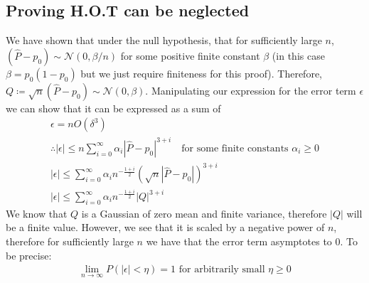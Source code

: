 \documentclass[]{article}
\newcommand{\Gaussian}{\mathcal{N}}
\begin{document}
\subsection{Proving H.O.T can be neglected}
We have shown that under the null hypothesis, that for sufficiently large $n$, $(\hat{P}-p_0) \sim \Gaussian(0, \beta/n)$ for some positive finite constant $\beta$ (in this case $\beta = p_0(1-p_0)$ but we just require finiteness for this proof). Therefore, $Q \coloneqq \sqrt{n} (\hat{P} - p_0) \sim \Gaussian(0,\beta)$. Manipulating our expression for the error term $\epsilon$ we can show that it can be expressed as a sum of 
%
\begin{equation}
\begin{gathered}
\epsilon = n O(\delta^3) \\
\therefore |\epsilon| \leq n \sum_{i=0}^{\infty} \alpha_i|\hat{P} - p_0|^{3+i} 
\quad \text{for some finite constants } \alpha_i \geq 0 \\
|\epsilon| \leq \sum_{i=0}^{\infty} \alpha_i n^{-\frac{1+i}{2}}( \sqrt{n}|\hat{P} - p_0|)^{3+i} \\
|\epsilon| \leq \sum_{i=0}^{\infty} \alpha_i n^{-\frac{1+i}{2}}|Q|^{3+i}
\end{gathered}
\end{equation}
%
We know that $Q$ is a Gaussian of zero mean and finite variance, therefore $|Q|$ will be a finite value. However, we see that it is scaled by a negative power of $n$, therefore for sufficiently large $n$ we have that the error term asymptotes to 0. To be precise:
%
\begin{equation}
\begin{gathered}
\lim_{n \rightarrow \infty} P(|\epsilon| < \eta) = 1 \text{ for arbitrarily small } \eta \ge 0
\end{gathered}
\end{equation}

\nocite{*}
\printbibliography
\end{document}
